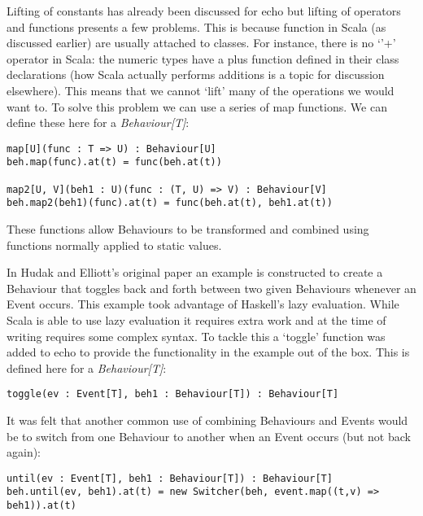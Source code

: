 \documentclass[12pt]{article}
\begin{document}
        Lifting of constants has already been discussed for echo but lifting of operators and
        functions presents a few problems. This is because function in Scala (as discussed earlier)
        are usually attached to classes. For instance, there is no `'+' operator in Scala: the numeric
        types have a plus function defined in their class declarations (how Scala actually performs additions
        is a topic for discussion elsewhere). This means that we cannot `lift' many of the operations we
        would want to. To solve this problem we can use a series of map functions. We can define these
        here for a \emph{Behaviour[T]}:

\begin{verbatim}
map[U](func : T => U) : Behaviour[U]
beh.map(func).at(t) = func(beh.at(t))

map2[U, V](beh1 : U)(func : (T, U) => V) : Behaviour[V]
beh.map2(beh1)(func).at(t) = func(beh.at(t), beh1.at(t))
\end{verbatim}        

        These functions allow Behaviours to be transformed and combined using functions
        normally applied to static values.
        
        In Hudak and Elliott's original paper an example is constructed to create a Behaviour
        that toggles back and forth between two given Behaviours whenever an Event occurs. This
        example took advantage of Haskell's lazy evaluation. While Scala is able to use lazy evaluation
        it requires extra work and at the time of writing requires some complex syntax. To tackle this
        a `toggle' function was added to echo to provide the functionality in the example out of the box.
        This is defined here for a \emph{Behaviour[T]}:
        
\begin{verbatim}
toggle(ev : Event[T], beh1 : Behaviour[T]) : Behaviour[T]
\end{verbatim}        
        
        It was felt that another common use of combining Behaviours and Events would be
        to switch from one Behaviour to another when an Event occurs (but not back again):

\begin{verbatim}
until(ev : Event[T], beh1 : Behaviour[T]) : Behaviour[T]
beh.until(ev, beh1).at(t) = new Switcher(beh, event.map((t,v) => beh1)).at(t)
\end{verbatim}        
        
\end{document}
